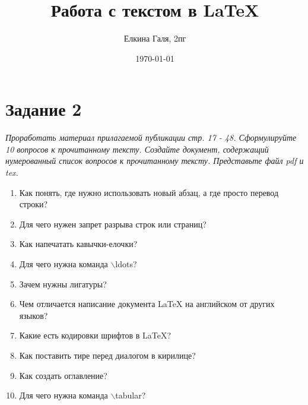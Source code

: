 \documentclass[a4paper,12pt]{article}
\author{Елкина Галя, 2пг}
\title{Работа с текстом в \LaTeX{}}
\date{\today}
\begin{document}
\maketitle
\newpage

\section*{Задание 2}

\textit{Проработать материал прилагаемой публикации стр. 17 - 48.
Сформулируйте 10 вопросов к прочитанному тексту.
Создайте документ, содержащий нумерованный список вопросов к прочитанному тексту.
Представьте файл pdf и tex.}

\begin{enumerate}
    \item Как понять, где нужно использовать новый абзац, а где просто перевод строки?
    \item Для чего нужен запрет разрыва строк или страниц?
    \item Как напечатать кавычки-елочки?
    \item Для чего нужна команда $\backslash$ldots?
    \item Зачем нужны лигатуры?
    \item Чем отличается написание документа LaTeX на английском от других языков?
    \item Какие есть кодировки шрифтов в \LaTeX?
    \item Как поставить тире перед диалогом в кирилице?
    \item Как создать оглавление?
    \item Для чего нужна команда $\backslash$tabular?
\end{enumerate}
\end{document}
